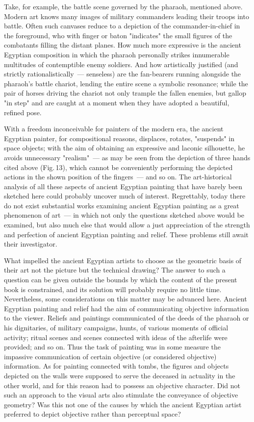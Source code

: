 Take, for example, the battle scene governed by the pharaoh, mentioned above. Modern
art knows many images of military commanders leading their troops into battle. Often
such canvases reduce to a depiction of the commander-in-chief in the foreground, who
with finger or baton "indicates" the small figures of the combatants filling the distant
planes. How much more expressive is the ancient Egyptian composition in which the
pharaoh personally strikes innumerable multitudes of contemptible enemy soldiers. And
how artistically justified (and strictly rationalistically~--- senseless) are the fan-bearers
running alongside the pharaoh's battle chariot, lending the entire scene a symbolic
resonance; while the pair of horses driving the chariot not only trample the fallen
enemies, but gallop "in step" and are caught at a moment when they have adopted a
beautiful, refined pose.

With a freedom inconceivable for painters of the modern era, the ancient Egyptian
painter, for compositional reasons, displaces, rotates, "suspends" in space objects; with
the aim of obtaining an expressive and laconic silhouette, he avoids unnecessary
"realism"~--- as may be seen from the depiction of three hands cited above (Fig.\,13),
which cannot be conveniently performing the depicted actions in the shown position of
the fingers~--- and so on. The art-historical analysis of all these aspects of ancient
Egyptian painting that have barely been sketched here could probably uncover much of
interest. Regrettably, today there do not exist substantial works examining ancient
Egyptian painting as a great phenomenon of art~--- in which not only the questions
sketched above would be examined, but also much else that would allow a just
appreciation of the strength and perfection of ancient Egyptian painting and relief.
These problems still await their investigator.


What impelled the ancient Egyptian artists to choose as the geometric basis of their art
not the picture but the technical drawing? The answer to such a question can be given
outside the bounds by which the content of the present book is constrained, and its
solution will probably require no little time. Nevertheless, some considerations on this
matter may be advanced here. Ancient Egyptian painting and relief had the aim of
communicating objective information to the viewer. Reliefs and paintings communicated
of the deeds of the pharaoh or his dignitaries, of military campaigns, hunts, of various
moments of official activity; ritual scenes and scenes connected with ideas of the afterlife
were provided; and so on. Thus the task of painting was in some measure the impassive
communication of certain objective (or considered objective) information. As for
painting connected with tombs, the figures and objects depicted on the walls were
supposed to serve the deceased in actuality in the other world, and for this reason had
to possess an objective character. Did not such an approach to the visual arts also
stimulate the conveyance of objective geometry? Was this not one of the causes by
which the ancient Egyptian artist preferred to depict objective rather than perceptual
space?

